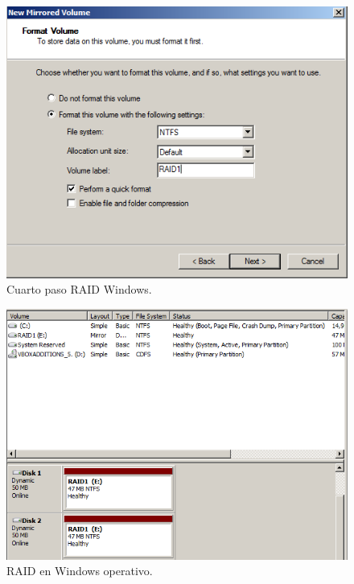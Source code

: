 \begin{figure}[H]
	\centering
	\includegraphics[scale=0.75]{RAIDW4.png}
	\caption{Cuarto paso RAID Windows. \label{fig:figura8}}
\end{figure}

\begin{figure}[H]
	\centering
	\includegraphics[scale=0.65]{RAIDW5.png}
	\caption{RAID en Windows operativo. \label{fig:figura9}}
\end{figure}

